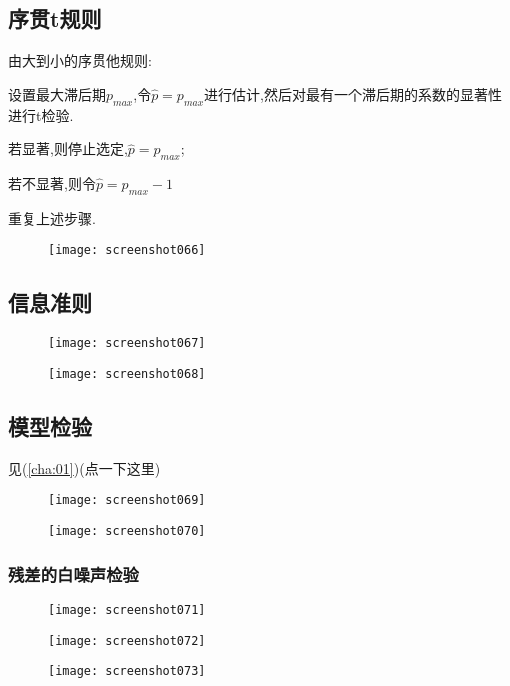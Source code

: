 \documentclass[11pt,a4paper,oneside]{book}
\begin{document}
\subsection{序贯t规则}
由大到小的序贯他规则:

设置最大滞后期$ p_{max} $,令$ \hat{p}=p_{max} $进行估计,然后对最有一个滞后期的系数的显著性进行t检验.

若显著,则停止选定,$ \hat{p}=p_{max} $;

若不显著,则令$ \hat{p}=p_{max}-1 $

重复上述步骤.

\begin{figure}[H]
	\texttt{[image: screenshot066]}
	\label{fig:screenshot066}
\end{figure}

\subsection{信息准则}

\begin{figure}[H]
	\texttt{[image: screenshot067]}
	\label{fig:screenshot067}
\end{figure}
\begin{figure}[H]
	\texttt{[image: screenshot068]}
	\label{fig:screenshot068}
\end{figure}

\subsection{模型检验}
见(\ref{cha:01})(点一下这里)
\begin{figure}[H]
	\texttt{[image: screenshot069]}
	\label{fig:screenshot069}
\end{figure}
\begin{figure}[H]
	\texttt{[image: screenshot070]}
	\label{fig:screenshot070}
\end{figure}
\subsubsection{残差的白噪声检验}
\begin{figure}[H]
	\texttt{[image: screenshot071]}
	\label{fig:screenshot071}
\end{figure}
\begin{figure}[H]
	\texttt{[image: screenshot072]}
	\label{fig:screenshot072}
\end{figure}
\begin{figure}[H]
	\texttt{[image: screenshot073]}
	\label{fig:screenshot073}
\end{figure}
\end{document}
